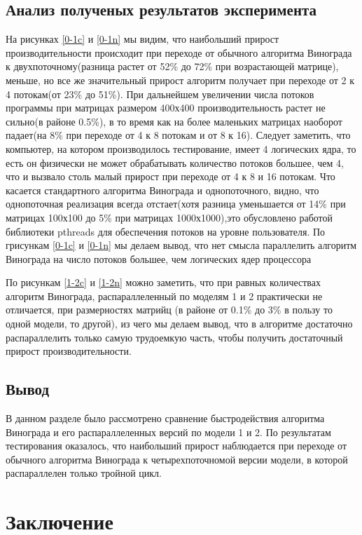 \documentclass[a4paper, 14pt]{article}
\begin{document}
        \subsection{Анализ полученых результатов эксперимента}
        На рисунках \ref{0-1c} и \ref{0-1n} мы видим, что наибольший прирост производительности происходит при переходе от обычного алгоритма Винограда к двухпоточному(разница растет от 52\% до 72\% при возрастающей матрице), меньше, но все же значительный прирост алгоритм получает при переходе от 2 к 4 потокам(от 23\% до 51\%). При дальнейшем увеличении числа потоков программы при матрицах размером 400х400 производительность растет не сильно(в районе 0.5\%), в то время как на более маленьких матрицах наоборот падает(на 8\% при переходе от 4 к 8 потокам и от 8 к 16). Следует заметить, что компьютер, на котором производилось тестирование, имеет 4 логических ядра, то есть он физически не может обрабатывать количество потоков большее, чем 4, что и вызвало столь малый прирост при переходе от 4 к 8 и 16 потокам. Что касается стандартного алгоритма Винограда и однопоточного, видно, что однопоточная реализация всегда отстает(хотя разница уменьшается от 14\% при матрицах 100х100 до 5\% при матрицах 1000х1000),это обусловлено работой библиотеки pthreads для обеспечения потоков на уровне пользователя. По грисункам \ref{0-1c} и \ref{0-1n} мы делаем вывод, что нет смысла параллелить алгоритм Винограда на число потоков большее, чем логических ядер процессора
        
        По рисункам \ref{1-2c} и \ref{1-2n} можно заметить, что при равных количествах алгоритм Винограда, распараллеленный по моделям 1 и 2 практически не отличается, при размерностях матрийц (в районе от 0.1\% до 3\% в пользу то одной модели, то другой), из чего мы делаем вывод, что в алгоритме достаточно распараллелить только самую трудоемкую часть, чтобы получить достаточный прирост производительности.
        \newpage 
	\subsection{Вывод}
	В данном разделе было рассмотрено сравнение быстродействия алгоритма Винограда и его распараллеленных версий по модели 1 и 2. По результатам тестирования оказалось, что наибольший прирост наблюдается при переходе от обычного алгоритма Винограда к четырехпоточномой версии модели, в которой распараллелен только тройной цикл.

    	\newpage
        \section*{Заключение}
        
\end{document}
